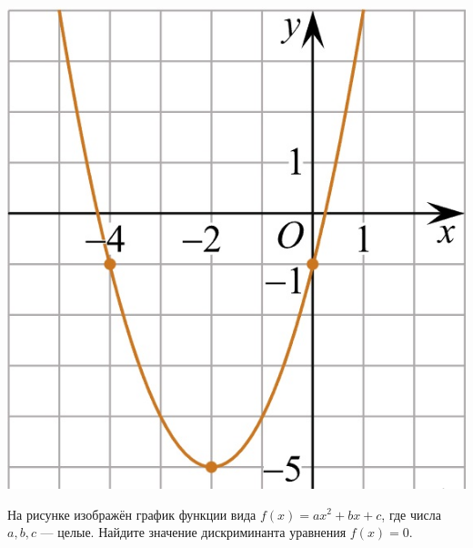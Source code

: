 \begin{class}[number=4]
\begin{listofex}
\begin{minipage}[c]{0.25\textwidth}
			\includegraphics[align=t, width=\textwidth]{pics/G101M4C4-4.jpg}
		\end{minipage}
		\item
		\begin{minipage}[t]{0.67\textwidth}
			На рисунке изображён график функции вида \(f(x)=ax^2+bx+c\), где числа \(a, b, c\) --- целые. Найдите значение дискриминанта уравнения \(f(x)=0\).
		\end{minipage}
		\begin{minipage}[c]{0.25\textwidth}

\end{minipage}
\end{listofex}
\end{class}
